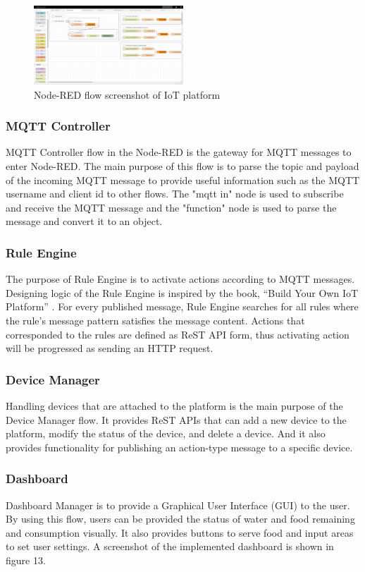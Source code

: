 \documentclass[conference]{IEEEtran}
\begin{document}
\begin{figure}[htbp]
\centerline{\includegraphics[width=0.5\textwidth]{./images/node-red-platform-screenshot.png}}
\caption{Node-RED flow screenshot of IoT platform}
\label{fig}
\end{figure}

\subsubsection{MQTT Controller}
MQTT Controller flow in the Node-RED is the gateway for MQTT messages to enter Node-RED.
The main purpose of this flow is to parse the topic and payload of the incoming MQTT message to provide useful information such as the MQTT username and client id to other flows.
The "mqtt in" node is used to subscribe and receive the MQTT message and the "function" node is used to parse the message and convert it to an object.

\subsubsection{Rule Engine}
The purpose of Rule Engine is to activate actions according to MQTT messages.
Designing logic of the Rule Engine is inspired by the book, “Build Your Own IoT Platform” \cite{b22}.
For every published message, Rule Engine searches for all rules where the rule’s message pattern satisfies the message content.
Actions that corresponded to the rules are defined as ReST API form, thus activating action will be progressed as sending an HTTP request.

\subsubsection{Device Manager}
Handling devices that are attached to the platform is the main purpose of the Device Manager flow.
It provides ReST APIs that can add a new device to the platform, modify the status of the device, and delete a device.
And it also provides functionality for publishing an action-type message to a specific device.

\subsubsection{Dashboard}
Dashboard Manager is to provide a Graphical User Interface (GUI) to the user.
By using this flow, users can be provided the status of water and food remaining and consumption visually.
It also provides buttons to serve food and input areas to set user settings. A screenshot of the implemented dashboard is shown in figure 13.
\end{document}
